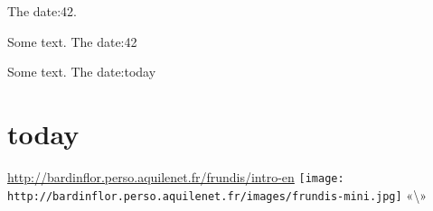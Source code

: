 The date:42.


Some text. The date:42

Some text. The date:today

\chapter{today}
\label{s:1}
\url{http://bardinflor.perso.aquilenet.fr/frundis/intro-en}
\texttt{[image: http://bardinflor.perso.aquilenet.fr/images/frundis-mini.jpg]}
«\textbackslash{}»

